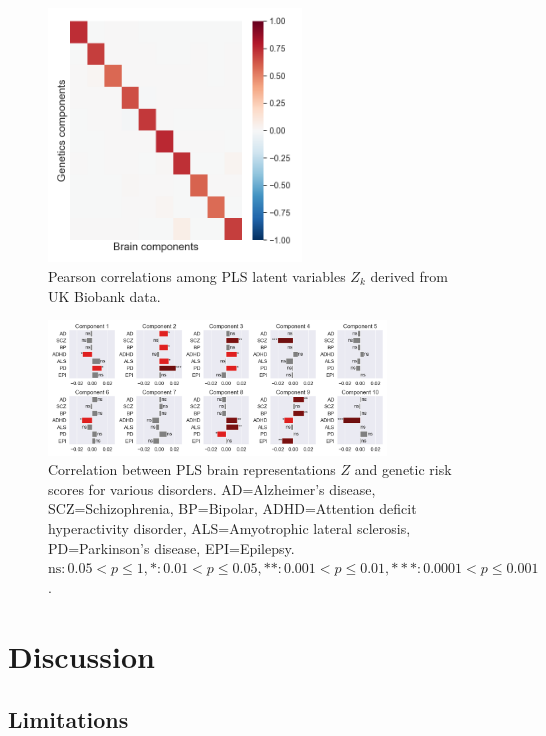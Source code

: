 \begin{figure}
    \centering
    \includegraphics[width=0.6\textwidth,trim={0.8cm 0cm 0.3cm 0cm}]{figures/UKBB/cross_corr.png}
    \caption{Pearson correlations among PLS latent variables \( Z_k \) derived from UK Biobank data.}
    \label{fig:UKBB_corr}
\end{figure}

\begin{figure}
    \centering
    \includegraphics[width=0.8\textwidth,trim={0.5cm 0cm 0.7cm 0cm}]{figures/UKBB/prs_correlations.png}
    \caption{Correlation between PLS brain representations \( Z \) and genetic risk scores for various disorders. AD=Alzheimer's disease, SCZ=Schizophrenia, BP=Bipolar, ADHD=Attention deficit hyperactivity disorder, ALS=Amyotrophic lateral sclerosis, PD=Parkinson's disease, EPI=Epilepsy. $\text{ns}: 0.05< p \leq 1, \ast: 0.01< p \leq 0.05, \ast\ast: 0.001< p \leq 0.01, \ast\ast\ast: 0.0001< p \leq 0.001$.}
    \label{fig:genetic_risk}
\end{figure}

\section{Discussion}

\subsection{Limitations}

